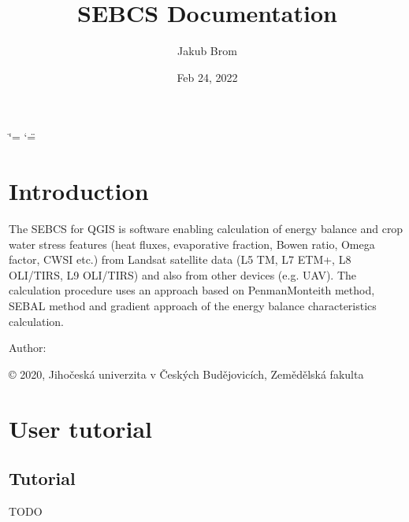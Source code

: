 \documentclass[letterpaper,10pt,english]{sphinxmanual}
\title{SEBCS Documentation}
\date{Feb 24, 2022}
\author{Jakub Brom}
\begin{document}
\ifdefined\shorthandoff
  \ifnum\catcode`\=\string=\active\shorthandoff{=}\fi
  \ifnum\catcode`\"=\active{}\fi
\fi

\pagestyle{empty}
\sphinxmaketitle
\pagestyle{plain}
\sphinxtableofcontents
\pagestyle{normal}
\label{\detokenize{index::doc}}



\chapter{Introduction}
\label{\detokenize{index:introduction}}
\sphinxAtStartPar
The SEBCS for QGIS is software enabling calculation of energy balance and crop water stress features (heat fluxes, evaporative fraction, Bowen ratio, Omega factor, CWSI etc.) from Landsat satellite data (L5 TM, L7 ETM+, L8 OLI/TIRS, L9 OLI/TIRS) and also from other devices (e.g. UAV).
The calculation procedure uses an approach based on Penman\sphinxhyphen{}Monteith method, SEBAL method and gradient approach of the energy balance characteristics calculation.

\begin{DUlineblock}{0em}
\item[] 
\end{DUlineblock}
\begin{description}
\item[{Author:}] \leavevmode
{}

\end{description}

\begin{DUlineblock}{0em}
\item[] 
\end{DUlineblock}

\sphinxAtStartPar
© 2020, Jihočeská univerzita v Českých Budějovicích, Zemědělská fakulta

\noindent{}


\chapter{User tutorial}
\label{\detokenize{index:user-tutorial}}

\section{Tutorial}
\label{\detokenize{tutorial:tutorial}}\label{\detokenize{tutorial::doc}}
\sphinxAtStartPar
TODO
\end{document}

